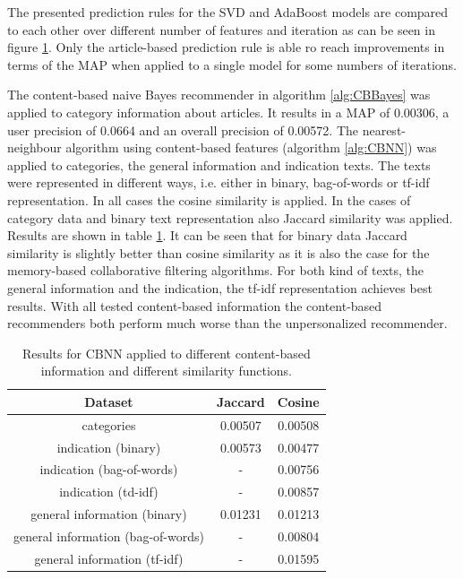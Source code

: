 \documentclass[10pt]{reportMaster}
\begin{document}
\begin{figure}
\begin{subfigure}[c]{1\textwidth}
	\end{subfigure}
	\label{fig:LogRegSVDPrediction}
\end{figure}

The presented prediction rules for the SVD and AdaBoost models are compared to each other over different number of features and iteration as can be seen in figure \ref{fig:LogRegSVDPrediction}.
Only the article-based prediction rule is able ro reach improvements in terms of the MAP when applied to a single  model for some numbers of iterations.

The content-based naive Bayes recommender in algorithm \ref{alg:CBBayes} was applied to category information about articles.
It results in a MAP of 0.00306, a user precision of 0.0664 and an overall precision of 0.00572.
The nearest-neighbour algorithm using content-based features (algorithm \ref{alg:CBNN}) was applied to categories, the general information and indication texts.
The texts were represented in different ways, i.e. either in binary, bag-of-words or tf-idf representation.
In all cases the cosine similarity is applied.
In the cases of category data and binary text representation also Jaccard similarity was applied. 
Results are shown in table \ref{tab:CBNN}.
It can be seen that for binary data Jaccard similarity is slightly better than cosine similarity as it is also the case for the memory-based collaborative filtering algorithms.
For both kind of texts, the general information and the indication, the tf-idf representation achieves best results.
With all tested content-based information the content-based recommenders both perform much worse than the unpersonalized recommender.

\begin{table}
	\caption{Results for CBNN applied to different content-based information and different similarity functions.}
\label{tab:CBNN}
\begin{tabular}{|c||c|c|}
	\hline
\textbf{Dataset}&\textbf{Jaccard}&\textbf{Cosine}\\ \hline
categories&0.00507&0.00508\\ \hline
indication (binary)&0.00573&0.00477\\ \hline	
indication (bag-of-words)&-&0.00756\\ \hline	
indication (td-idf)&-&0.00857\\ \hline	
general information (binary)&0.01231&0.01213\\ \hline	
general information (bag-of-words)&-&0.00804\\ \hline	
general information (tf-idf)&-&0.01595\\ \hline	
\end{tabular}
\end{table}
\end{document}
